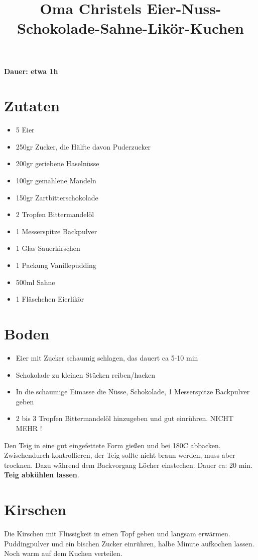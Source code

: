 \documentclass[10pt]{proc}
\title{Oma Christels Eier-Nuss-Schokolade-Sahne-Likör-Kuchen}
\author{}
\begin{document}
\maketitle

\textbf{Dauer: etwa 1h}
\section{Zutaten}
\begin{itemize}
	\item 5 Eier
	\item 250gr Zucker, die Hälfte davon Puderzucker
	\item 200gr geriebene Haselnüsse
	\item 100gr gemahlene Mandeln
	\item 150gr Zartbitterschokolade
	\item 2 Tropfen Bittermandelöl
	\item 1 Messerspitze Backpulver
	\item 1 Glas Sauerkirschen
	\item 1 Packung Vanillepudding
	\item 500ml Sahne
	\item 1 Fläschchen Eierlikör
\end{itemize}

\section{Boden}
\begin{itemize}
	\item Eier mit Zucker schaumig schlagen, das dauert ca 5-10 min
	\item Schokolade zu kleinen Stücken reiben/hacken
	\item In die schaumige Eimasse die Nüsse, Schokolade, 1 Messerspitze Backpulver geben
	\item 2 bis 3 Tropfen Bittermandelöl hinzugeben und gut einrühren. NICHT MEHR !
\end{itemize}
Den Teig in eine gut eingefettete Form gießen und bei 180C abbacken. Zwischendurch kontrollieren, der Teig sollte nicht braun werden, muss aber trocknen. Dazu während dem Backvorgang Löcher einstechen. Dauer ca: 20 min.
\\
\textbf{Teig abkühlen lassen}.
\section{Kirschen}
Die Kirschen mit Flüssigkeit in einen Topf geben und langsam erwärmen. Puddingpulver und ein bischen Zucker einrühren, halbe Minute aufkochen lassen.\\
Noch warm auf dem Kuchen verteilen.
\end{document}
